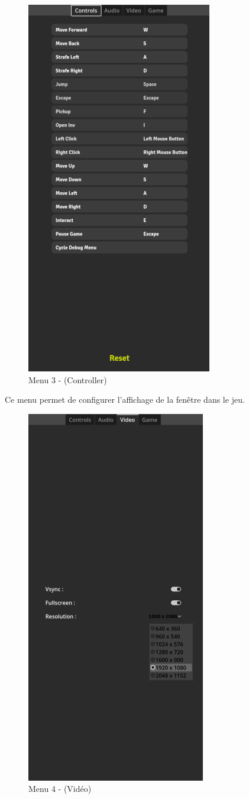 \documentclass[
	article,			%
	11pt,				%
	oneside,			%
	a4paper,			%
	chapter=TITLE,
	french,			%
	sumario=tradicional
	]{base_nt}
\begin{document}
\begin{figure}[ht]
	\caption{Menu 3 - (Controller)}
	\centering
	\includegraphics[width=0.5\linewidth]{paper31.png}
	\legend{}
	
\end{figure}

\newpage

Ce menu permet de configurer l'affichage de la fenêtre dans le jeu.

\begin{figure}[ht]
	\caption{Menu 4 - (Vidéo)}
	\centering
	\includegraphics[width=0.5\linewidth]{paper32.png}
	\legend{}
	
\end{figure}
\end{document}
